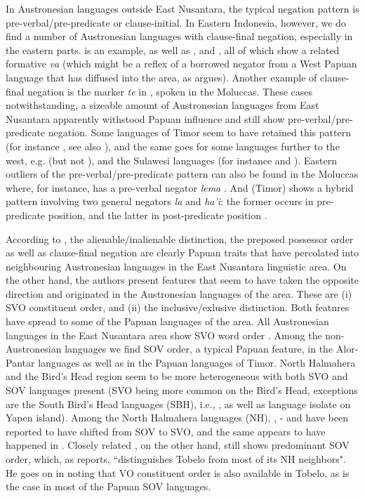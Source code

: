 In Austronesian languages outside East Nusantara, the typical negation pattern is pre-verbal/pre-predicate or clause-initial. In Eastern Indonesia, however, we do find a number of Austronesian languages with clause-final negation, especially in the eastern parts.  is an example, as well as ,  and  \citep{gasser2014windesi}, all of which show a related formative \textit{va} (which might be a reflex of a borrowed negator from a West Papuan language that has diffused into the area, as \citet{reesink2002eastern} argues). Another example of clause-final negation is the marker \textit{te} in , spoken in the Moluccas. These cases notwithstanding, a sizeable amount of Austronesian languages from East Nusantara apparently withstood Papuan influence and still show pre-verbal/pre-predicate negation. Some languages of Timor seem to have retained this pattern (for instance , see also \citealt[132]{klamer2008east}), and the same goes for some languages further to the west, e.g.  (but not ), and the Sulawesi languages (for instance  and ). Eastern outliers of the pre-verbal/pre-predicate pattern can also be found in the Moluccas where, for instance,  has a pre-verbal negator \textit{lema} \citep[140]{coward2005}. And  (Timor) shows a hybrid pattern involving two general negators \textit{la} and \textit{ha'i}: the former occurs in pre-predicate position, and the latter in post-predicate position \citep[228]{vanklinken1999grammar}.

According to \citet{klamer2008east}, the alienable/inalienable distinction, the preposed possessor order as well as clause-final negation are clearly Papuan traits that have percolated into neighbouring Austronesian languages in the East Nusantara linguistic area. On the other hand, the authors present features that seem to have taken the opposite direction and originated in the Austronesian languages of the area. These are (i) SVO constituent order, and (ii) the inclusive/exlusive distinction. Both features have spread to some of the Papuan languages of the area. All Austronesian languages in the East Nusantara area show SVO word order \citep[113]{klamer2008east}. Among the non-Austronesian languages we find SOV order, a typical Papuan feature, in the Alor-Pantar languages as well as in the Papuan languages of Timor. North Halmahera and the Bird's Head region seem to be more heterogeneous with both SVO and SOV languages present (SVO being more common on the Bird's Head, exceptions are the South Bird's Head languages (SBH), i.e., , as well as language isolate  on Yapen island). Among the North Halmahera languages (NH), , - and  have been reported to have shifted from SOV to SVO, and the same appears to have happened in  \citep[114]{klamer2008east}. Closely related , on the other hand, still shows predominant SOV order, which, as \citet[55]{holton2003tobelo} reports, ``distinguishes Tobelo from most of its NH neighbors". He goes on in noting that VO constituent order is also available in Tobelo, as is the case in most of the Papuan SOV languages.

